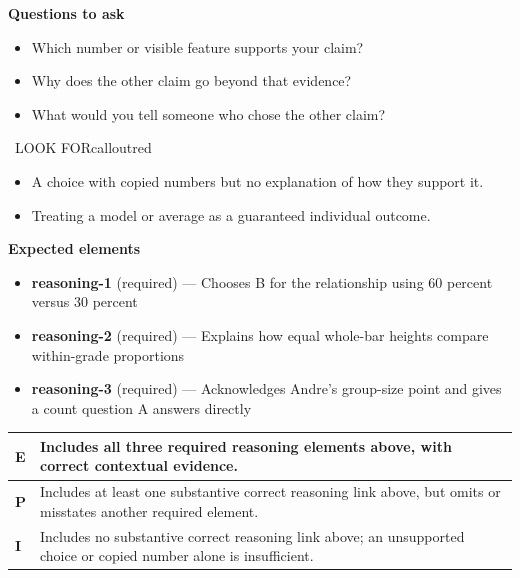 \documentclass[11pt]{article}
\begin{document}
\textbf{Questions to ask}
\begin{itemize}[leftmargin=1.5em,itemsep=2pt,topsep=2pt]
  \item Which number or visible feature supports your claim?
  \item Why does the other claim go beyond that evidence?
  \item What would you tell someone who chose the other claim?
\end{itemize}

\begin{callout}{\IconWarn\ LOOK FOR}{calloutred}
\begin{itemize}[leftmargin=1.5em,itemsep=2pt,topsep=2pt]
  \item A choice with copied numbers but no explanation of how they support it.
  \item Treating a model or average as a guaranteed individual outcome.
\end{itemize}
\end{callout}


\textbf{Expected elements}
\begin{itemize}[leftmargin=1.5em,itemsep=2pt,topsep=2pt]
  \item \textbf{reasoning-1} (required) --- Chooses B for the relationship using 60 percent versus 30 percent
  \item \textbf{reasoning-2} (required) --- Explains how equal whole-bar heights compare within-grade proportions
  \item \textbf{reasoning-3} (required) --- Acknowledges Andre's group-size point and gives a count question A answers directly
\end{itemize}

{\small\renewcommand{\arraystretch}{1.25}
\noindent\begin{tabular}{|p{0.5in}|p{5.9in}|}
\hline
\textbf{E} & Includes all three required reasoning elements above, with correct contextual evidence. \\ \hline
\textbf{P} & Includes at least one substantive correct reasoning link above, but omits or misstates another required element. \\ \hline
\textbf{I} & Includes no substantive correct reasoning link above; an unsupported choice or copied number alone is insufficient. \\ \hline
\end{tabular}}
\end{document}
